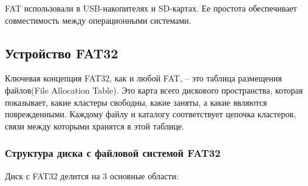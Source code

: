 FAT использовали в USB-накопителях и SD-картах. Ее простота обеспечивает совместимость между операционными системами.

\subsection{Устройство FAT32}

Ключевая концепция FAT32, как и любой FAT, -- это таблица размещения файлов(File Allocation Table). Это карта всего дискового пространства, которая показывает, какие кластеры свободны, какие заняты, а какие являются поврежденными. Каждому файлу и каталогу соответствует цепочка кластеров, связи между которыми хранятся в этой таблице.

\subsubsection{Структура диска с файловой системой FAT32}

Диск с FAT32 делится на 3 основные области:


